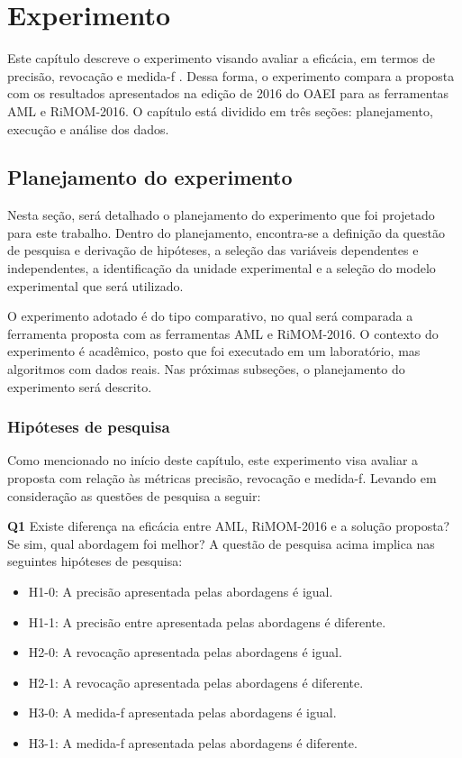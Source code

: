 \chapter{Experimento}
\label{cap:experimento}
Este capítulo descreve o experimento visando avaliar a eficácia, em termos de precisão, revocação e medida-f \cite{goutte2005probabilistic}. Dessa forma,  o experimento compara a proposta com os resultados apresentados na edição de 2016 do OAEI para as ferramentas AML e RiMOM-2016.
O capítulo está dividido em três seções: planejamento, execução e análise dos dados. 

\section{Planejamento do experimento}

Nesta seção, será detalhado o planejamento do experimento que foi projetado para este trabalho. Dentro do planejamento, encontra-se a definição da questão de pesquisa e derivação de hipóteses, a seleção das variáveis dependentes e independentes, a identificação da unidade experimental e a seleção do modelo experimental que será utilizado.

O experimento adotado é do tipo comparativo, no qual será comparada a ferramenta proposta com as ferramentas AML e RiMOM-2016. O contexto do experimento é acadêmico, posto que foi executado em um laboratório, mas algoritmos com dados reais. Nas próximas subseções, o planejamento do experimento será descrito.

\subsection{Hipóteses de pesquisa}

Como mencionado no início deste capítulo, este experimento visa avaliar a proposta com relação às métricas precisão, revocação e medida-f. Levando em consideração as questões de pesquisa a seguir:

\textbf{Q1} Existe diferença na eficácia entre AML, RiMOM-2016 e a solução proposta? Se sim, qual abordagem foi melhor?
A questão de pesquisa acima implica nas seguintes hipóteses de pesquisa:

\begin{itemize}
\item H1-0: A precisão apresentada pelas abordagens é igual.
\item H1-1: A precisão entre apresentada pelas abordagens é diferente.
\item H2-0: A revocação apresentada pelas abordagens é igual.
\item H2-1: A revocação apresentada pelas abordagens é diferente.
\item H3-0: A medida-f apresentada pelas abordagens é igual.
\item H3-1: A medida-f apresentada pelas abordagens é diferente.
\end{itemize}

